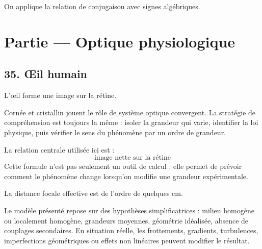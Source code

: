 \documentclass[11pt,a4paper]{article}
\begin{document}
\begin{corrigebox}[Indication]
On applique la relation de conjugaison avec signes algébriques.
\end{corrigebox}


\section{Partie — Optique physiologique}


\subsection{35. Œil humain}

\begin{exemplebox}
L'œil forme une image sur la rétine.
\end{exemplebox}

\begin{methodebox}
Cornée et cristallin jouent le rôle de système optique convergent.
La stratégie de compréhension est toujours la même : isoler la grandeur qui varie, identifier la loi physique, puis vérifier le sens du phénomène par un ordre de grandeur.
\end{methodebox}

\begin{theorembox}
La relation centrale utilisée ici est :
\[
\text{image nette sur la rétine}
\]
Cette formule n'est pas seulement un outil de calcul : elle permet de prévoir comment le phénomène change lorsqu'on modifie une grandeur expérimentale.
\end{theorembox}

\begin{odgbox}
La distance focale effective est de l'ordre de quelques cm.
\end{odgbox}

\begin{attentionbox}
Le modèle présenté repose sur des hypothèses simplificatrices : milieu homogène ou localement homogène, grandeurs moyennes, géométrie idéalisée, absence de couplages secondaires. En situation réelle, les frottements, gradients, turbulences, imperfections géométriques ou effets non linéaires peuvent modifier le résultat.
\end{attentionbox}
\end{document}
